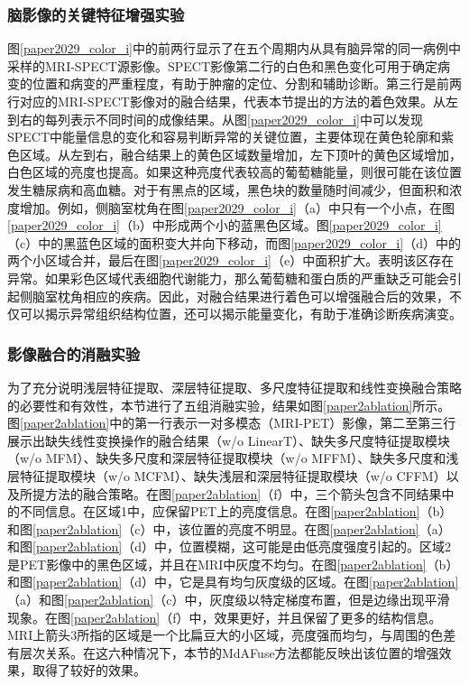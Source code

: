 \subsubsection{脑影像的关键特征增强实验}
图\ref{paper2029_color_i}中的前两行显示了在五个周期内从具有脑异常的同一病例中采样的MRI-SPECT源影像。SPECT影像第二行的白色和黑色变化可用于确定病变的位置和病变的严重程度，有助于肿瘤的定位、分割和辅助诊断。第三行是前两行对应的MRI-SPECT影像对的融合结果，代表本节提出的方法的着色效果。从左到右的每列表示不同时间的成像结果。从图\ref{paper2029_color_i}中可以发现SPECT中能量信息的变化和容易判断异常的关键位置，主要体现在黄色轮廓和紫色区域。从左到右，融合结果上的黄色区域数量增加，左下顶叶的黄色区域增加，白色区域的亮度也提高。如果这种亮度代表较高的葡萄糖能量，则很可能在该位置发生糖尿病和高血糖。对于有黑点的区域，黑色块的数量随时间减少，但面积和浓度增加。例如，侧脑室枕角在图\ref{paper2029_color_i}（a）中只有一个小点，在图\ref{paper2029_color_i}（b）中形成两个小的蓝黑色区域。图\ref{paper2029_color_i}（c）中的黑蓝色区域的面积变大并向下移动，而图\ref{paper2029_color_i}（d）中的两个小区域合并，最后在图\ref{paper2029_color_i}（e）中面积扩大。表明该区存在异常。如果彩色区域代表细胞代谢能力，那么葡萄糖和蛋白质的严重缺乏可能会引起侧脑室枕角相应的疾病。因此，对融合结果进行着色可以增强融合后的效果，不仅可以揭示异常组织结构位置，还可以揭示能量变化，有助于准确诊断疾病演变。

\subsubsection{影像融合的消融实验}
为了充分说明浅层特征提取、深层特征提取、多尺度特征提取和线性变换融合策略的必要性和有效性，本节进行了五组消融实验，结果如图\ref{paper2ablation}所示。图\ref{paper2ablation}中的第一行表示一对多模态（MRI-PET）影像，第二至第三行展示出缺失线性变换操作的融合结果（w/o LinearT）、缺失多尺度特征提取模块（w/o MFM）、缺失多尺度和深层特征提取模块（w/o MFFM）、缺失多尺度和浅层特征提取模块（w/o MCFM）、缺失浅层和深层特征提取模块（w/o CFFM）以及所提方法的融合策略。在图\ref{paper2ablation}（f）中，三个箭头包含不同结果中的不同信息。在区域1中，应保留PET上的亮度信息。在图\ref{paper2ablation}（b）和图\ref{paper2ablation}（c）中，该位置的亮度不明显。在图\ref{paper2ablation}（a）和图\ref{paper2ablation}（d）中，位置模糊，这可能是由低亮度强度引起的。区域2是PET影像中的黑色区域，并且在MRI中灰度不均匀。在图\ref{paper2ablation}（b）和图\ref{paper2ablation}（d）中，它是具有均匀灰度级的区域。在图\ref{paper2ablation}（a）和图\ref{paper2ablation}（c）中，灰度级以特定梯度布置，但是边缘出现平滑现象。在图\ref{paper2ablation}（f）中，效果更好，并且保留了更多的结构信息。MRI上箭头3所指的区域是一个比扁豆大的小区域，亮度强而均匀，与周围的色差有层次关系。在这六种情况下，本节的MdAFuse方法都能反映出该位置的增强效果，取得了较好的效果。

